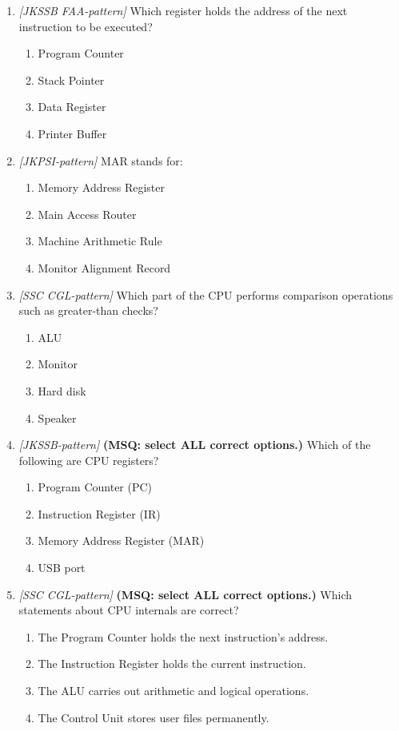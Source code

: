 \documentclass[11pt]{article}
\begin{document}
\begin{enumerate}[label=\textbf{Q\arabic*.}, leftmargin=*]
\item \textit{[JKSSB FAA-pattern]} Which register holds the address of the next instruction to be executed?
  \begin{enumerate}[label=\Alph*.]
    \item Program Counter
    \item Stack Pointer
    \item Data Register
    \item Printer Buffer
  \end{enumerate}
\item \textit{[JKPSI-pattern]} MAR stands for:
  \begin{enumerate}[label=\Alph*.]
    \item Memory Address Register
    \item Main Access Router
    \item Machine Arithmetic Rule
    \item Monitor Alignment Record
  \end{enumerate}
\item \textit{[SSC CGL-pattern]} Which part of the CPU performs comparison operations such as greater-than checks?
  \begin{enumerate}[label=\Alph*.]
    \item ALU
    \item Monitor
    \item Hard disk
    \item Speaker
  \end{enumerate}
\item \textit{[JKSSB-pattern]} \textbf{(MSQ: select ALL correct options.)} Which of the following are CPU registers?
  \begin{enumerate}[label=\Alph*.]
    \item Program Counter (PC)
    \item Instruction Register (IR)
    \item Memory Address Register (MAR)
    \item USB port
  \end{enumerate}
\item \textit{[SSC CGL-pattern]} \textbf{(MSQ: select ALL correct options.)} Which statements about CPU internals are correct?
  \begin{enumerate}[label=\Alph*.]
    \item The Program Counter holds the next instruction's address.
    \item The Instruction Register holds the current instruction.
    \item The ALU carries out arithmetic and logical operations.
    \item The Control Unit stores user files permanently.
  \end{enumerate}
\end{enumerate}
\def\JKSSBLessonID{5}\def\JKSSBAnswers{0}
\end{document}
